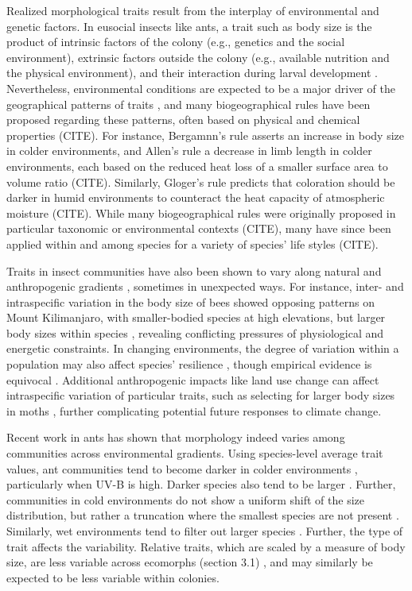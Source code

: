 \documentclass[review,preprint,3p]{elsarticle}
\begin{document}
	Realized morphological traits result from the interplay of environmental and genetic factors. In eusocial insects like ants, a trait such as body size is the product of intrinsic factors of the colony (e.g., genetics and the social environment), extrinsic factors outside the colony (e.g., available nutrition and the physical environment), and their interaction during larval development \cite{Wills2018}. Nevertheless, environmental conditions are expected to be a major driver of the geographical patterns of traits \cite{McGill2006}, and many biogeographical rules have been proposed regarding these patterns, often based on physical and chemical properties (CITE). For instance, Bergamnn's rule asserts an increase in body size in colder environments, and Allen's rule a decrease in limb length in colder environments, each based on the reduced heat loss of a smaller surface area to volume ratio (CITE). Similarly, Gloger's rule predicts that coloration should be darker in humid environments to counteract the heat capacity of atmospheric moisture (CITE). While many biogeographical rules were originally proposed in particular taxonomic or environmental contexts (CITE), many have since been applied within and among species for a variety of species' life styles (CITE). 
	
	Traits in insect communities have also been shown to vary along natural and anthropogenic gradients \cite{Reymond2013}, sometimes in unexpected ways. For instance, inter- and intraspecific variation in the body size of bees showed opposing patterns on Mount Kilimanjaro, with smaller-bodied species at high elevations, but larger body sizes within species \cite{Classen2017}, revealing conflicting pressures of physiological and energetic constraints. In changing environments, the degree of variation within a population may also affect species’ resilience \cite{Kuhsel2015}, though empirical evidence is equivocal \cite{Macheriotou2015}. Additional anthropogenic impacts like land use change can affect intraspecific variation of particular traits, such as selecting for larger body sizes in moths \cite{Merckx2018}, further complicating potential future responses to climate change. 
	
	Recent work in ants has shown that morphology indeed varies among communities across environmental gradients. Using species-level average trait values, ant communities tend to become darker in colder environments \cite{Kaspari2005,Bishop2016a}, particularly when UV-B is high. Darker species also tend to be larger \cite{Bishop2016a}. Further, communities in cold environments do not show a uniform shift of the size distribution, but rather a truncation where the smallest species are not present \cite{Reymond2013,Gibb2018}. Similarly, wet environments tend to filter out larger species \cite{Gibb2018}. Further, the type of trait affects the variability. Relative traits, which are scaled by a measure of body size, are less variable across ecomorphs (section 3.1) \cite{Sosiak2021}, and may similarly be expected to be less variable within colonies. 
	
\end{document}
